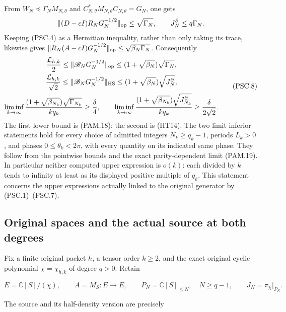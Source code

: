 From \(W_N\preceq\Gamma_NM_{N,\theta}\) and
\(C_{N,\theta}^*M_{N,\theta}C_{N,\theta}=G_N\), one gets
\[
 \|(D-cI)R_NG_N^{-1/2}\|_{\rm op}\le\sqrt{\Gamma_N},
 \qquad J_N^\partial\le q\Gamma_N .
\]
Keeping (PSC.4) as a Hermitian inequality, rather than only taking
its trace, likewise gives
\(\|R_N(A-cI)G_N^{-1/2}\|_{\rm op}
 \le\sqrt{\beta_N\Gamma_N}\).
Consequently
\[
 \begin{gathered}
 \frac{\mathcal L_{h,k}}2
 \le\|\mathscr B_NG_N^{-1/2}\|_{\rm op}
 \le(1+\sqrt{\beta_N})\sqrt{\Gamma_N},\\
 \frac{\mathcal L_{h,k}}{\sqrt2}
 \le\|\mathscr B_NG_N^{-1/2}\|_{\rm HS}
 \le(1+\sqrt{\beta_N})\sqrt{J_N^\partial},\\
 \liminf_{k\to\infty}
 \frac{(1+\sqrt{\beta_{N_k}})\sqrt{\Gamma_{N_k}}}{kq_k}
 \ge\frac{\delta}{4},\qquad
 \liminf_{k\to\infty}
 \frac{(1+\sqrt{\beta_{N_k}})\sqrt{J_{N_k}^\partial}}{kq_k}
 \ge\frac{\delta}{2\sqrt2}.
 \end{gathered}
 \tag{PSC.8}\label{eq:psc-upperfloor}
\]
The first lower bound is (PAM.18); the second is (HT14).
The two limit inferior statements hold for every choice of
admitted integers \(N_k\ge q_k-1\), periods \(L_k>0\), and phases
\(0\le\theta_k<2\pi\), with every quantity on its indicated
same phase. They follow from the pointwise bounds and the exact
parity-dependent limit (PAM.19). In particular neither computed
upper expression is \(o(k)\): each divided by \(k\) tends to
infinity at least as its displayed positive multiple of \(q_k\).
This statement concerns the upper expressions actually linked
to the original generator by (PSC.1)--(PSC.7).


\subsection{Original spaces and the actual source at both degrees}

Fix a finite original packet \(h\), a tensor order \(k\geq2\), and the exact original cyclic polynomial \(\chi=\chi_{h,k}\) of degree \(q>0\). Retain

\[
 E=\mathbb C[S]/(\chi),\qquad A=M_S:E\longrightarrow E,
 \qquad P_N=\mathbb C[S]_{\leq N},\quad N\geq q-1,
 \qquad J_N=\pi_\chi|_{P_N}.
 \tag{PSC.9}
\]

The source and its half-density version are precisely

